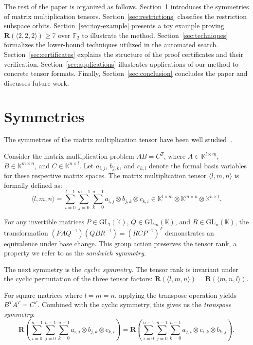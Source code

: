 \documentclass[11pt]{article}
\begin{document}
The rest of the paper is organized as follows.
Section~\ref{sec:symmetries} introduces the symmetries of matrix multiplication tensors.
Section~\ref{sec:restrictions} classifies the restriction subspace orbits.
Section~\ref{sec:toy-example} presents a toy example proving $\mathbf{R}(\langle 2,2,2\rangle)\ge 7$ over $\mathbb{F}_2$ to illustrate the method.
Section~\ref{sec:techniques} formalizes the lower-bound techniques utilized in the automated search.
Section~\ref{sec:certificates} explains the structure of the proof certificates and their verification.
Section~\ref{sec:applications} illustrates applications of our method to concrete tensor formats.
Finally, Section~\ref{sec:conclusion} concludes the paper and discusses future work.

\section{Symmetries}\label{sec:symmetries}
The symmetries of the matrix multiplication tensor have been well studied~\cite{de1978varieties,chiantini2019geometry}.

Consider the matrix multiplication problem $A B = C^T$, where $A \in \mathbb{K}^{l\times m}$, $B \in \mathbb{K}^{m\times n}$, and $C \in \mathbb{K}^{n\times l}$.
Let $a_{i,j}$, $b_{j,k}$, and $c_{k,i}$ denote the formal basis variables for these respective matrix spaces. The matrix multiplication tensor $\langle l,m,n\rangle$ is formally defined as:
$$
  \langle l,m,n\rangle = \sum_{i=0}^{l-1}\sum_{j=0}^{m-1}\sum_{k=0}^{n-1} a_{i,j}\otimes b_{j,k}\otimes c_{k,i} \in \mathbb{K}^{l\times m} \otimes \mathbb{K}^{m\times n} \otimes \mathbb{K}^{n\times l}.
$$

For any invertible matrices $P \in \mathrm{GL}_l(\mathbb{K})$, $Q \in \mathrm{GL}_m(\mathbb{K})$, and $R \in \mathrm{GL}_n(\mathbb{K})$, the transformation $(P A Q^{-1})(Q B R^{-1}) = (R C P^{-1})^T$ demonstrates an equivalence under base change. This group action preserves the tensor rank, a property we refer to as the \emph{sandwich symmetry}.

The next symmetry is the \emph{cyclic symmetry}. The tensor rank is invariant under the cyclic permutation of the three tensor factors:
$\mathbf{R}(\langle l,m,n\rangle) = \mathbf{R}(\langle m,n,l\rangle)$.

For square matrices where $l=m=n$, applying the transpose operation yields $B^T A^T = C^T$. Combined with the cyclic symmetry, this gives us the \emph{transpose symmetry}:
$$
  \mathbf{R} \left( \sum_{i=0}^{n-1}\sum_{j=0}^{n-1}\sum_{k=0}^{n-1} a_{i,j}\otimes b_{j,k}\otimes c_{k,i} \right) =
  \mathbf{R} \left( \sum_{i=0}^{n-1}\sum_{j=0}^{n-1}\sum_{k=0}^{n-1} a_{j,i}\otimes c_{i,k}\otimes b_{k,j} \right).
$$
\end{document}
